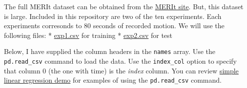 \documentclass[11pt]{article}
\begin{document}
    The full MERIt dataset can be obtained from the
\href{http://www.rst.e-technik.tu-dortmund.de/cms/en/research/robotics/TUDOR_engl/index.html\#h3MERIt}{MERIt
site}. But, this dataset is large. Included in this repository are two
of the ten experiments. Each experiments corresonds to 80 seconds of
recorded motion. We will use the following files: *
\href{./exp1.csv}{exp1.csv} for training * \href{./exp2.csv}{exp2.csv}
for test

Below, I have supplied the column headers in the \texttt{names} array.
Use the \texttt{pd.read\_csv} command to load the data. Use the
\texttt{index\_col} option to specify that column 0 (the one with time)
is the \emph{index} column. You can review
\href{../simp_lin_reg/auto_mpg.ipynb}{simple linear regression demo} for
examples of using the \texttt{pd.read\_csv} command.
\end{document}
